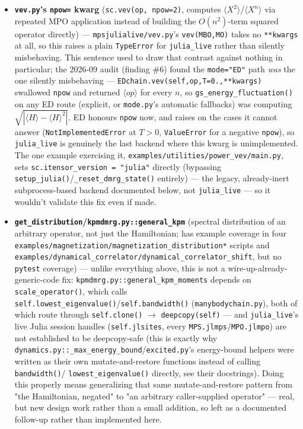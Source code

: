 \documentclass[11pt]{article}
\begin{document}
\begin{itemize}
\item \textbf{\texttt{vev.py}'s \texttt{npow=} kwarg}
  (\texttt{sc.vev(op, npow=2)}, computes $\langle X^2\rangle$/$\langle
  X^n\rangle$ via repeated MPO application instead of building the
  $O(n^2)$-term squared operator directly) --- \texttt{mpsjulialive/vev.py}'s
  \texttt{vev(MBO,MO)} takes no \texttt{**kwargs} at all, so this raises
  a plain \texttt{TypeError} for \texttt{julia\_live} rather than
  silently misbehaving. This sentence used to draw that contrast against
  nothing in particular; the 2026-09 audit (finding \#6) found the
  \texttt{mode="ED"} path \emph{was} the one silently misbehaving ---
  \texttt{EDchain.vev(self,op,T=0.,**kwargs)} swallowed \texttt{npow} and
  returned $\langle op\rangle$ for every $n$, so
  \texttt{gs\_energy\_fluctuation()} on any ED route (explicit, or
  \texttt{mode.py}'s automatic fallbacks) was computing
  $\sqrt{|\langle H\rangle-\langle H\rangle^2|}$. ED honours
  \texttt{npow} now, and raises on the cases it cannot answer
  (\texttt{NotImplementedError} at $T>0$, \texttt{ValueError} for a
  negative \texttt{npow}), so \texttt{julia\_live} is genuinely the last
  backend where this kwarg is unimplemented. The one example exercising it,
  \texttt{examples/utilities/power\_vev/main.py}, sets
  \texttt{sc.itensor\_version = "julia"} directly (bypassing
  \texttt{setup\_julia()}/\texttt{\_reset\_dmrg\_state()} entirely) ---
  the legacy, already-inert subprocess-based backend documented below,
  not \texttt{julia\_live} --- so it wouldn't validate this fix even if
  made.
\item \textbf{\texttt{get\_distribution}/\texttt{kpmdmrg.py::general\_kpm}}
  (spectral distribution of an arbitrary operator, not just the
  Hamiltonian; has example coverage in four
  \texttt{examples/magnetization/magnetization\_distribution*} scripts and
  \texttt{examples/dynamical\_correlator/dynamical\_correlator\_shift},
  but no \texttt{pytest} coverage) --- unlike everything above, this is
  not a wire-up-already-generic-code fix:
  \texttt{kpmdmrg.py::general\_kpm\_moments} depends on
  \texttt{scale\_operator()}, which calls
  \texttt{self.lowest\_eigenvalue()}/\texttt{self.bandwidth()}
  (\texttt{manybodychain.py}), both of which route through
  \texttt{self.clone()} $\to$ \texttt{deepcopy(self)} --- and
  \texttt{julia\_live}'s live Julia session handles
  (\texttt{self.jlsites}, every \texttt{MPS.jlmps}/\texttt{MPO.jlmpo})
  are not established to be deepcopy-safe (this is exactly why
  \texttt{dynamics.py::\_max\_energy\_bound}/\texttt{excited.py}'s
  energy-bound helpers were written as their own mutate-and-restore
  functions instead of calling \texttt{bandwidth()}/
  \texttt{lowest\_eigenvalue()} directly, see their docstrings). Doing
  this properly means generalizing that same mutate-and-restore pattern
  from "the Hamiltonian, negated" to "an arbitrary caller-supplied
  operator" --- real, but new design work rather than a small addition,
  so left as a documented follow-up rather than implemented here.
\end{itemize}
\end{document}
